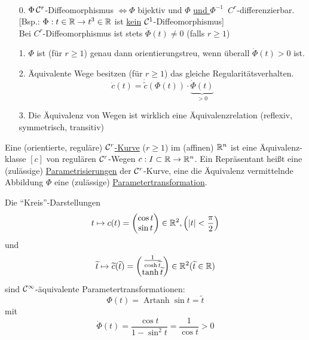 \begin{bemerkung} \(\)
 \begin{enumerate}
  \item[0.] \(\Phi \, \mathcal{C}^r\)-Diffeomorphismus \(\Leftrightarrow \Phi\) bijektiv und \(\Phi\) \uline{und \(\Phi^{-1}\)}\, \(C^r\)-differenzierbar. 
  [Bsp.: \(\Phi: t \in \mathbb{R} \to t^3 \in \mathbb{R}\) ist \uline{kein} \(\mathcal{C}^1\)-Diffeomorphismus] \\
  Bei \(C^r\)-Diffeomorphismus ist stets \(\dot \Phi(t)\ne 0\) (falls \(r\ge 1\))
  \item[1.] \(\Phi\) ist (für \(r\ge 1\)) genau dann orientierungstreu, wenn überall \(\dot \Phi(t)>0\) ist.
  \item[2.] Äquivalente Wege besitzen (für \(r\ge 1\)) das gleiche Regularitätsverhalten.
  \[
   \dot c(t)= \dot{\widetilde c} (\Phi(t)) \cdot \underbrace{\dot \Phi(t)}_{>0}
  \]
  \item[3.] Die Äquivalenz von Wegen ist wirklich eine Äquivalenzrelation (reflexiv, symmetrisch, transitiv)
 \end{enumerate}
\end{bemerkung}

\begin{definition}
 Eine (orientierte, reguläre) \uline{\(\mathcal{C}^r\)-Kurve} (\(r\ge1\)) im (affinen) \(\mathbb{R}^n\) ist eine Äquivalenz-klasse \([c]\) von regulären \(\mathcal{C}^r\)-Wegen \(c : I \subset \mathbb{R} \to \mathbb{R}^n\). Ein Repräsentant heißt eine (zulässige) \uline{Parametrisierungen} der \(\mathcal{C}^r\)-Kurve, eine die Äquivalenz vermittelnde Abbildung \(\Phi\) eine (zulässige) \uline{Parametertransformation}.
\end{definition}

\begin{bsp}
 Die "`Kreis"'-Darstellungen 
 \[
 t \mapsto c(t)=\begin{pmatrix}
                 \cos t \\
                 \sin t
                \end{pmatrix} \in \mathbb{R}^2, \left(|t|<\frac\pi2\right)
 \]
 und 
     \[
      \widetilde t\mapsto \widetilde c(\widetilde t) = \begin{pmatrix}
                                             \frac1{\cosh \widetilde t} \\
                                             \tanh \widetilde t
                                            \end{pmatrix} \in \mathbb{R}^2 (\widetilde t \in \mathbb{R}) 
     \]
 sind \(\mathcal{C}^\infty\)-äquivalente Parametertransformationen: \[
                                                            \Phi(t) = \operatorname{Artanh} \sin t = \widetilde t
                                                           \]
mit
\[
 \dot \Phi(t)=\frac{\cos t}{1-\sin^2 t}= \frac1{\cos t} >0
\]
\end{bsp}

